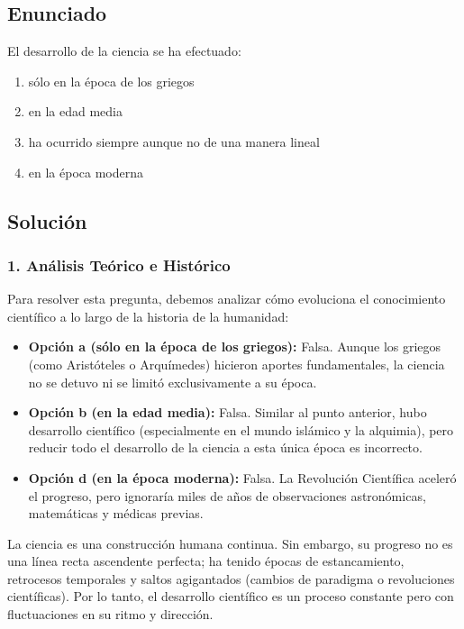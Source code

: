 \documentclass[12pt, a4paper]{article}
\begin{document}

\subsection*{Enunciado}
El desarrollo de la ciencia se ha efectuado:
\begin{enumerate}[label=\alph*)]
    \item sólo en la época de los griegos
    \item en la edad media
    \item ha ocurrido siempre aunque no de una manera lineal
    \item en la época moderna
\end{enumerate}

\subsection*{Solución}

\subsubsection*{1. Análisis Teórico e Histórico}
Para resolver esta pregunta, debemos analizar cómo evoluciona el conocimiento científico a lo largo de la historia de la humanidad:

\begin{itemize}
    \item \textbf{Opción a (sólo en la época de los griegos):} Falsa. Aunque los griegos (como Aristóteles o Arquímedes) hicieron aportes fundamentales, la ciencia no se detuvo ni se limitó exclusivamente a su época.
    \item \textbf{Opción b (en la edad media):} Falsa. Similar al punto anterior, hubo desarrollo científico (especialmente en el mundo islámico y la alquimia), pero reducir todo el desarrollo de la ciencia a esta única época es incorrecto.
    \item \textbf{Opción d (en la época moderna):} Falsa. La Revolución Científica aceleró el progreso, pero ignoraría miles de años de observaciones astronómicas, matemáticas y médicas previas.
\end{itemize}

La ciencia es una construcción humana continua. Sin embargo, su progreso no es una línea recta ascendente perfecta; ha tenido épocas de estancamiento, retrocesos temporales y saltos agigantados (cambios de paradigma o revoluciones científicas). Por lo tanto, el desarrollo científico es un proceso constante pero con fluctuaciones en su ritmo y dirección.
\end{document}
